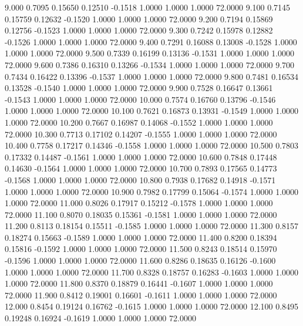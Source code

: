    9.000   0.7095   0.15650   0.12510  -0.1518   1.0000   1.0000   1.0000  72.0000
   9.100   0.7145   0.15759   0.12632  -0.1520   1.0000   1.0000   1.0000  72.0000
   9.200   0.7194   0.15869   0.12756  -0.1523   1.0000   1.0000   1.0000  72.0000
   9.300   0.7242   0.15978   0.12882  -0.1526   1.0000   1.0000   1.0000  72.0000
   9.400   0.7291   0.16088   0.13008  -0.1528   1.0000   1.0000   1.0000  72.0000
   9.500   0.7339   0.16199   0.13136  -0.1531   1.0000   1.0000   1.0000  72.0000
   9.600   0.7386   0.16310   0.13266  -0.1534   1.0000   1.0000   1.0000  72.0000
   9.700   0.7434   0.16422   0.13396  -0.1537   1.0000   1.0000   1.0000  72.0000
   9.800   0.7481   0.16534   0.13528  -0.1540   1.0000   1.0000   1.0000  72.0000
   9.900   0.7528   0.16647   0.13661  -0.1543   1.0000   1.0000   1.0000  72.0000
  10.000   0.7574   0.16760   0.13796  -0.1546   1.0000   1.0000   1.0000  72.0000
  10.100   0.7621   0.16873   0.13931  -0.1549   1.0000   1.0000   1.0000  72.0000
  10.200   0.7667   0.16987   0.14068  -0.1552   1.0000   1.0000   1.0000  72.0000
  10.300   0.7713   0.17102   0.14207  -0.1555   1.0000   1.0000   1.0000  72.0000
  10.400   0.7758   0.17217   0.14346  -0.1558   1.0000   1.0000   1.0000  72.0000
  10.500   0.7803   0.17332   0.14487  -0.1561   1.0000   1.0000   1.0000  72.0000
  10.600   0.7848   0.17448   0.14630  -0.1564   1.0000   1.0000   1.0000  72.0000
  10.700   0.7893   0.17565   0.14773  -0.1568   1.0000   1.0000   1.0000  72.0000
  10.800   0.7938   0.17682   0.14918  -0.1571   1.0000   1.0000   1.0000  72.0000
  10.900   0.7982   0.17799   0.15064  -0.1574   1.0000   1.0000   1.0000  72.0000
  11.000   0.8026   0.17917   0.15212  -0.1578   1.0000   1.0000   1.0000  72.0000
  11.100   0.8070   0.18035   0.15361  -0.1581   1.0000   1.0000   1.0000  72.0000
  11.200   0.8113   0.18154   0.15511  -0.1585   1.0000   1.0000   1.0000  72.0000
  11.300   0.8157   0.18274   0.15663  -0.1589   1.0000   1.0000   1.0000  72.0000
  11.400   0.8200   0.18394   0.15816  -0.1592   1.0000   1.0000   1.0000  72.0000
  11.500   0.8243   0.18514   0.15970  -0.1596   1.0000   1.0000   1.0000  72.0000
  11.600   0.8286   0.18635   0.16126  -0.1600   1.0000   1.0000   1.0000  72.0000
  11.700   0.8328   0.18757   0.16283  -0.1603   1.0000   1.0000   1.0000  72.0000
  11.800   0.8370   0.18879   0.16441  -0.1607   1.0000   1.0000   1.0000  72.0000
  11.900   0.8412   0.19001   0.16601  -0.1611   1.0000   1.0000   1.0000  72.0000
  12.000   0.8454   0.19124   0.16762  -0.1615   1.0000   1.0000   1.0000  72.0000
  12.100   0.8495   0.19248   0.16924  -0.1619   1.0000   1.0000   1.0000  72.0000
